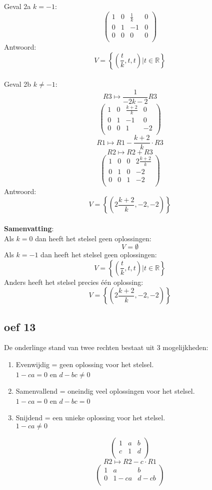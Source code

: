 \documentclass[lineaire_algebra_oplossingen.tex]{subfiles}
\begin{document}
Geval 2a $k=-1$:
\[
\begin{pmatrix}
1 & 0 & \frac{1}{k} & 0\\
0 & 1 & -1 & 0\\
0 & 0 & 0 & 0\\
\end{pmatrix}
\]
Antwoord:
\[
V=\left\lbrace\left(\frac{t}{k},t,t\right) | t \in \mathbb{R}\right\rbrace
\]\\
Geval 2b $k\neq-1$:
\[ R3 \longmapsto \frac{1}{-2k-2}R3\]
\[
\begin{pmatrix}
1 & 0 & \frac{k+2}{k} & 0\\
0 & 1 & -1 & 0\\
0 & 0 & 1 & -2\\
\end{pmatrix}
\]
\[ R1 \longmapsto R1 - \frac{k+2}{k}\cdot R3 \]
\[ R2 \longmapsto R2 + R3 \]
\[
\begin{pmatrix}
1 & 0 & 0 & 2\frac{k+2}{k}\\
0 & 1 & 0 & -2\\
0 & 0 & 1 & -2\\
\end{pmatrix}
\]
Antwoord:
\[
V=\left\lbrace\left(2\frac{k+2}{k},-2,-2\right)\right\rbrace
\]\\
\textbf{Samenvatting}:\\
Als $k=0$ dan heeft het stelsel geen oplossingen:
\[
V=\emptyset
\]
Als $k=-1$ dan heeft het stelsel geen oplossingen:
\[
V=\left\lbrace\left(\frac{t}{k},t,t\right) | t \in \mathbb{R}\right\rbrace
\]
Anders heeft het stelsel precies één oplossing:
\[
V=\left\lbrace\left(2\frac{k+2}{k},-2,-2\right)\right\rbrace
\]

\subsection{oef 13}
De onderlinge stand van twee rechten bestaat uit 3 mogelijkheden:
\begin{enumerate}
\item Evenwijdig = geen oplossing voor het stelsel.\\
$1-ca = 0$ en $ d -bc \neq 0$
\item Samenvallend = oneindig veel oplossingen voor het stelsel.\\
$1-ca = 0$ en $ d -bc = 0$
\item Snijdend = een unieke oplossing voor het stelsel.\\
$1-ca \neq 0$
\end{enumerate}
\[
\begin{pmatrix}
1 & a & b\\
c & 1 & d\\
\end{pmatrix}
\]
\[ R2 \longmapsto R2 - c \cdot R1\]
\[
\begin{pmatrix}
1 & a & b\\
0 & 1-ca & d-cb\\
\end{pmatrix}
\]
\end{document}
